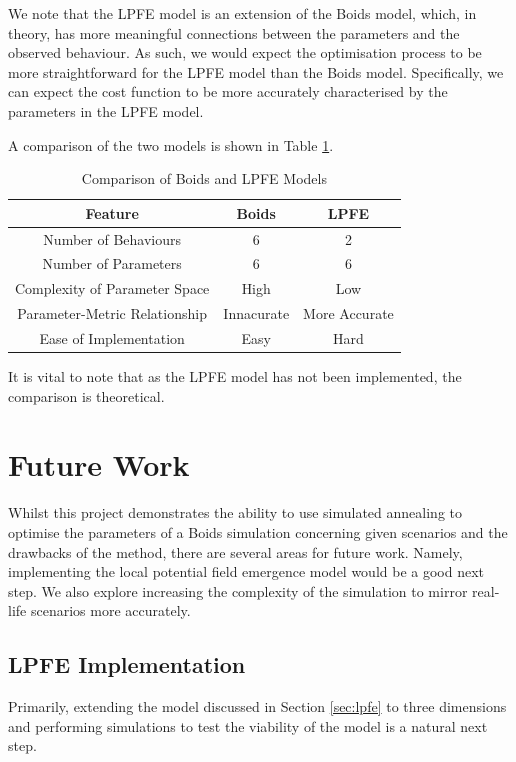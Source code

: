 \documentclass[12pt]{article}
\begin{document}
We note that the LPFE model is an extension of the Boids model, which, in theory, has more meaningful connections between the parameters and the observed behaviour. As such, we would expect the optimisation process to be more straightforward for the LPFE model than the Boids model. Specifically, we can expect the cost function to be more accurately characterised by the parameters in the LPFE model.

A comparison of the two models is shown in Table \ref{tab:model-comparison}.

\begin{table}[ht]
    \centering
    \begin{tabular}{|c|c|c|}
        \hline
       Feature & Boids & LPFE \\
        \hline\hline
        Number of Behaviours & 6 & 2 \\
        \hline
        Number of Parameters & 6 & 6 \\
        \hline
        Complexity of Parameter Space & High & Low \\
        \hline
        Parameter-Metric Relationship & Innacurate & More Accurate \\
        \hline
        Ease of Implementation & Easy & Hard \\
        \hline
    \end{tabular}
    \caption{Comparison of Boids and LPFE Models}
    \label{tab:model-comparison}
\end{table}

It is vital to note that as the LPFE model has not been implemented, the comparison is theoretical.

\newpage
\section{Future Work}
Whilst this project demonstrates the ability to use simulated annealing to optimise the parameters of a Boids simulation concerning given scenarios and the drawbacks of the method, there are several areas for future work. Namely, implementing the local potential field emergence model would be a good next step. We also explore increasing the complexity of the simulation to mirror real-life scenarios more accurately.

\subsection{LPFE Implementation}
Primarily, extending the model discussed in Section \ref{sec:lpfe} to three dimensions and performing simulations to test the viability of the model is a natural next step.
\end{document}
